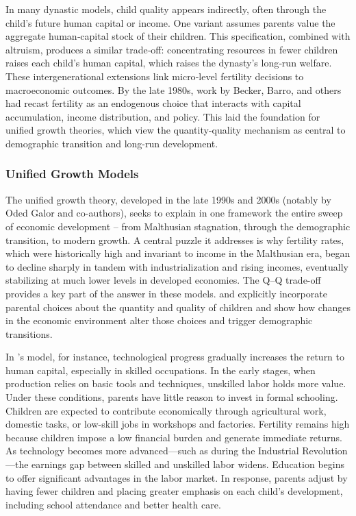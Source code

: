 \documentclass[]{AEA}
\begin{document}
In many dynastic models, child quality appears indirectly, often through
the child's future human capital or income. One variant assumes parents
value the aggregate human‐capital stock of their children. This
specification, combined with altruism, produces a similar trade‐off:
concentrating resources in fewer children raises each child's human
capital, which raises the dynasty's long‐run welfare. These
intergenerational extensions link micro‐level fertility decisions to
macroeconomic outcomes. By the late 1980s, work by Becker, Barro, and
others had recast fertility as an endogenous choice that interacts with
capital accumulation, income distribution, and policy. This laid the
foundation for unified growth theories, which view the quantity-quality
mechanism as central to demographic transition and long-run development.

\subsubsection{Unified Growth Models}

The unified growth theory, developed in the late 1990s and 2000s
(notably by Oded Galor and co-authors), seeks to explain in one
framework the entire sweep of economic development -- from Malthusian
stagnation, through the demographic transition, to modern growth. A
central puzzle it addresses is why fertility rates, which were
historically high and invariant to income in the Malthusian era, began
to decline sharply in tandem with industrialization and rising incomes,
eventually stabilizing at much lower levels in developed economies. The
Q--Q trade-off provides a key part of the answer in these models.
\citet{galor2000population} and \citet{galor2002natural} explicitly
incorporate parental choices about the quantity and quality of children
and show how changes in the economic environment alter those choices and
trigger demographic transitions.

In \citet{galor2000population}'s model, for instance, technological
progress gradually increases the return to human capital, especially in
skilled occupations. In the early stages, when production relies on
basic tools and techniques, unskilled labor holds more value. Under
these conditions, parents have little reason to invest in formal
schooling. Children are expected to contribute economically through
agricultural work, domestic tasks, or low-skill jobs in workshops and
factories. Fertility remains high because children impose a low
financial burden and generate immediate returns. As technology becomes
more advanced---such as during the Industrial Revolution---the earnings
gap between skilled and unskilled labor widens. Education begins to
offer significant advantages in the labor market. In response, parents
adjust by having fewer children and placing greater emphasis on each
child's development, including school attendance and better health care.
\end{document}
